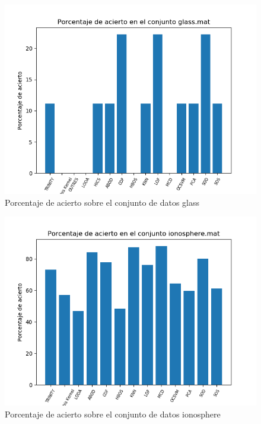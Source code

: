 \begin{figure}[H]
	\centering
	\label{glass_accuracy}
	\includegraphics[scale=0.7]{imagenes/imgs-exp1/accuracy/glass}
	\caption{Porcentaje de acierto sobre el conjunto de datos glass}
\end{figure}

\begin{figure}[H]
	\centering
	\label{ionosphere_accuracy}
	\includegraphics[scale=0.7]{imagenes/imgs-exp1/accuracy/ionosphere}
	\caption{Porcentaje de acierto sobre el conjunto de datos ionosphere}
\end{figure}

